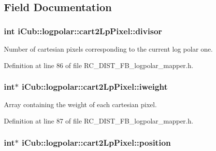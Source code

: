 \subsection{Field Documentation}
\subsubsection[{divisor}]{\setlength{\rightskip}{0pt plus 5cm}int i\+Cub\+::logpolar\+::cart2\+Lp\+Pixel\+::divisor}\label{structiCub_1_1logpolar_1_1cart2LpPixel_ad3d40afcf0194c2333729044a0b10d3a}


Number of cartesian pixels corresponding to the current log polar one. 



Definition at line 86 of file R\+C\+\_\+\+D\+I\+S\+T\+\_\+\+F\+B\+\_\+logpolar\+\_\+mapper.\+h.

\subsubsection[{iweight}]{\setlength{\rightskip}{0pt plus 5cm}int$\ast$ i\+Cub\+::logpolar\+::cart2\+Lp\+Pixel\+::iweight}\label{structiCub_1_1logpolar_1_1cart2LpPixel_ad1672ced4db91126ae43b5fa27e3033e}


Array containing the weight of each cartesian pixel. 



Definition at line 87 of file R\+C\+\_\+\+D\+I\+S\+T\+\_\+\+F\+B\+\_\+logpolar\+\_\+mapper.\+h.

\subsubsection[{position}]{\setlength{\rightskip}{0pt plus 5cm}int$\ast$ i\+Cub\+::logpolar\+::cart2\+Lp\+Pixel\+::position}\label{structiCub_1_1logpolar_1_1cart2LpPixel_a4fe110e9885ce107c9d8f82ca12e204a}


